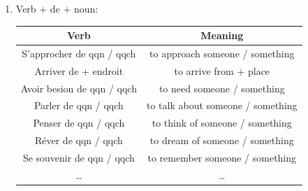 \documentclass{book}
\begin{document}
\begin{enumerate}
\begin{enumerate}
                        \item Verb + de + noun:
                            \begin{center}
                                \begin{tabular}{|c|c|}
                                    \hline
                                    \textbf{Verb} & \textbf{Meaning}\\
                                    \hline
                                    S'approcher de qqn / qqch & to approach someone / something\\
                                    Arriver de + endroit & to arrive from + place\\
                                    Avoir besion de qqn / qqch & to need someone / something\\
                                    Parler de qqn / qqch & to talk about someone / something\\
                                    Penser de qqn / qqch & to think of someone / something\\
                                    Réver de qqn / qqch & to dream of someone / something\\
                                    Se souvenir de qqn / qqch & to remember someone / something\\
                                    \dots & \dots\\
                                    \hline
                                \end{tabular}
                            \end{center}
                        

\end{enumerate}
\end{enumerate}
\end{document}
